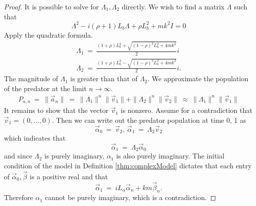 \documentclass[11pt,reqno]{amsart}
\numberwithin{equation}{section}
\theoremstyle{plain}
\begin{document}
\begin{proof}
    It is possible to solve for $\Lambda_1, \Lambda_2$ directly. 
We wish to find a matrix $\Lambda$ such that 
\begin{equation}
\Lambda^2 - i(\rho + 1) L_b \Lambda + \rho L_b^2+ mk^2 I = 0
\end{equation}
    Apply the quadratic formula. 
    \begin{eqnarray}
        \Lambda_1 \ = \ 
        \frac {
        (1 + \rho) L_b^2 + 
        \sqrt{
        (1-\rho)^2L_b^2 + 4mk^2
        }
        } 2 i \nonumber \\ 
 \Lambda_2 \ = \ 
        \frac {
        (1 + \rho) L_b^2 - 
        \sqrt{
        (1-\rho)^2L_b^2 + 4mk^2
        }
        } 2 i. 
    \end{eqnarray}
    The magnitude of $\Lambda_1$ is greater than that of $\Lambda_2$. 
    We approximate the population of the predator at the limit $n \rightarrow \infty$. 
    \begin{eqnarray}
        P_{a, n} \ = \ \|\vec a_n\| \ = \ 
        \|\Lambda_1\|^n \|\vec v_1\| + 
 \|\Lambda_2\|^n \|\vec v_2\| 
 \ \approx  \ 
\|\Lambda_1\|^n \|\vec v_1\|
    \end{eqnarray}
    It remains to show that the vector $\vec v_1$ is nonzero. Assume for a contradiction that $\vec v_1 = (0, \dots, 0)$. Then we can write out the predator population at time 0, 1 as 
    \begin{equation}
    \vec \alpha_0 \ = \ \vec v_2, \ \vec \alpha_1 \ = \ \Lambda_2 \vec v_2 
    \end{equation}
    which indicates that 
    \begin{equation}
    \vec \alpha_1 \ = \ \Lambda_2 \vec \alpha_0
    \end{equation}
    and since $\Lambda_2$ is purely imaginary, $\alpha_1$ is also purely imaginary. 
    The initial condition of the model in Definition \ref{thm:complexModel} 
    dictates that each entry of $\vec \alpha_0, \vec \beta$ is a positive real and that 
    \begin{equation}
    \vec \alpha_1 \ = \ iL_{\alpha} \vec \alpha_n + km \vec\beta_n.
    \end{equation}
    Therefore $\alpha_1 $ cannot be purely imaginary, which is a contradiction. 
\end{proof}


\end{document}
